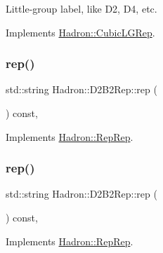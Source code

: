 Little-\/group label, like D2, D4, etc. 

Implements \mbox{\hyperlink{structHadron_1_1CubicLGRep_a9bdb14b519a611d21379ed96a3a9eb41}{Hadron\+::\+Cubic\+L\+G\+Rep}}.

\mbox{\label{structHadron_1_1D2B2Rep_abef26c913db470d0e9a5c6209c79269f}} 
\subsubsection{\texorpdfstring{rep()}{rep()}\hspace{0.1cm}{\footnotesize\ttfamily [1/5]}}
{\footnotesize\ttfamily std\+::string Hadron\+::\+D2\+B2\+Rep\+::rep (\begin{DoxyParamCaption}{ }\end{DoxyParamCaption}) const\hspace{0.3cm}{\ttfamily [inline]}, {\ttfamily [virtual]}}



Implements \mbox{\hyperlink{structHadron_1_1RepRep_ab3213025f6de249f7095892109575fde}{Hadron\+::\+Rep\+Rep}}.

\mbox{\label{structHadron_1_1D2B2Rep_abef26c913db470d0e9a5c6209c79269f}} 
\subsubsection{\texorpdfstring{rep()}{rep()}\hspace{0.1cm}{\footnotesize\ttfamily [2/5]}}
{\footnotesize\ttfamily std\+::string Hadron\+::\+D2\+B2\+Rep\+::rep (\begin{DoxyParamCaption}{ }\end{DoxyParamCaption}) const\hspace{0.3cm}{\ttfamily [inline]}, {\ttfamily [virtual]}}



Implements \mbox{\hyperlink{structHadron_1_1RepRep_ab3213025f6de249f7095892109575fde}{Hadron\+::\+Rep\+Rep}}.

\mbox{\label{structHadron_1_1D2B2Rep_abef26c913db470d0e9a5c6209c79269f}} 

